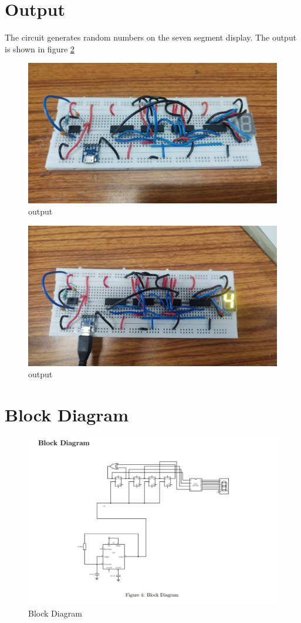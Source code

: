 \documentclass[journal,12pt,twocolumn]{IEEEtran}
\begin{document}
\begin{enumerate}
\section{Output} 
	The circuit generates random numbers on the seven segment display. The output is shown in figure \ref{final}
	\begin{figure}[h]
		\includegraphics[width = \linewidth]{images/pic1.jpg}
		\caption{output}
		\label{final}
	\end{figure} 
	\begin{figure}[h]
		\includegraphics[width = \linewidth]{images/pic2.jpg}
		\caption{output}
		\label{final}
	\end{figure} 
\newpage
\section{Block Diagram}
\begin{figure}[h]
		\includegraphics[width= \linewidth]{images/fig06.jpg}
		\caption{Block Diagram}
		\label{SSD}
	\end{figure}
	
\end{enumerate}
\end{document}
